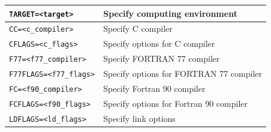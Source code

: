 \documentclass[a4paper]{article}
\begin{document}
\begin{table}[htbp]
\begin{center}
\begin{tabular}{|l|l|}
\verb+TARGET=<target>+   & Specify computing environment\\ \hline
\verb+CC=<c_compiler>+   & Specify C compiler\\ \hline
\verb+CFLAGS=<c_flags>+    & Specify options for C compiler\\ \hline
\verb+F77=<f77_compiler>+    & Specify FORTRAN 77 compiler\\ \hline
\verb+F77FLAGS=<f77_flags>+    & Specify options for FORTRAN 77 compiler\\ \hline
\verb+FC=<f90_compiler>+    & Specify Fortran 90 compiler\\ \hline
\verb+FCFLAGS=<f90_flags>+    & Specify options for Fortran 90 compiler\\ \hline
\verb+LDFLAGS=<ld_flags>+    & Specify link options\\ \hline
\end{tabular}
\end{center}
\end{table}
\end{document}
